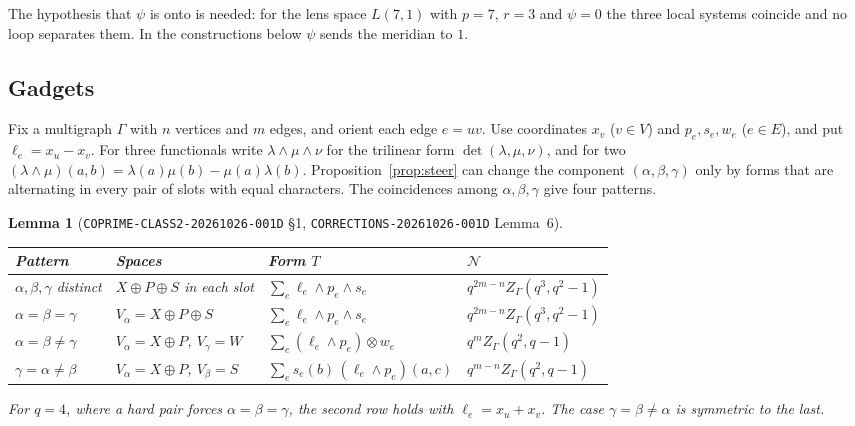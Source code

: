 \documentclass[11pt]{article}
\newtheorem{lemma}[theorem]{Lemma}
\theoremstyle{definition}
\theoremstyle{remark}
\newcommand{\cN}{\mathcal{N}}
\begin{document}
The hypothesis that $\psi$ is onto is needed: for the lens space $L(7,1)$ with
$p=7$, $r=3$ and $\psi=0$ the three local systems coincide and no loop
separates them. In the constructions below $\psi$ sends the meridian to $1$.

\subsection{Gadgets}

Fix a multigraph $\Gamma$ with $n$ vertices and $m$ edges, and orient each
edge $e=uv$. Use coordinates $x_v$ ($v\in V$) and $p_e,s_e,w_e$ ($e\in E$),
and put $\ell_e=x_u-x_v$. For three functionals write $\lambda\wedge\mu\wedge\nu$
for the trilinear form $\det(\lambda,\mu,\nu)$, and for two
$(\lambda\wedge\mu)(a,b)=\lambda(a)\mu(b)-\mu(a)\lambda(b)$. Proposition~\ref{prop:steer}
can change the component $(\alpha,\beta,\gamma)$ only by forms that are
alternating in every pair of slots with equal characters. The coincidences
among $\alpha,\beta,\gamma$ give four patterns.

\begin{lemma}[\texttt{COPRIME-CLASS2-20261026-001D} \S1, \texttt{CORRECTIONS-20261026-001D} Lemma~6]\label{lem:gadget}
\begin{center}
\begin{tabular}{@{}llll@{}}
\toprule
Pattern & Spaces & Form $T$ & $\cN$\\
\midrule
$\alpha,\beta,\gamma$ distinct & $X\oplus P\oplus S$ in each slot & $\sum_e\ell_e\wedge p_e\wedge s_e$ & $q^{2m-n}Z_\Gamma(q^3,q^2-1)$\\
$\alpha=\beta=\gamma$ & $V_\alpha=X\oplus P\oplus S$ & $\sum_e\ell_e\wedge p_e\wedge s_e$ & $q^{2m-n}Z_\Gamma(q^3,q^2-1)$\\
$\alpha=\beta\ne\gamma$ & $V_\alpha=X\oplus P$, $V_\gamma=W$ & $\sum_e(\ell_e\wedge p_e)\otimes w_e$ & $q^{m}Z_\Gamma(q^2,q-1)$\\
$\gamma=\alpha\ne\beta$ & $V_\alpha=X\oplus P$, $V_\beta=S$ & $\sum_e s_e(b)\,(\ell_e\wedge p_e)(a,c)$ & $q^{m-n}Z_\Gamma(q^2,q-1)$\\
\bottomrule
\end{tabular}
\end{center}
For $q=4$, where a hard pair forces $\alpha=\beta=\gamma$, the second row holds
with $\ell_e=x_u+x_v$. The case $\gamma=\beta\ne\alpha$ is symmetric to the
last.
\end{lemma}
\end{document}
